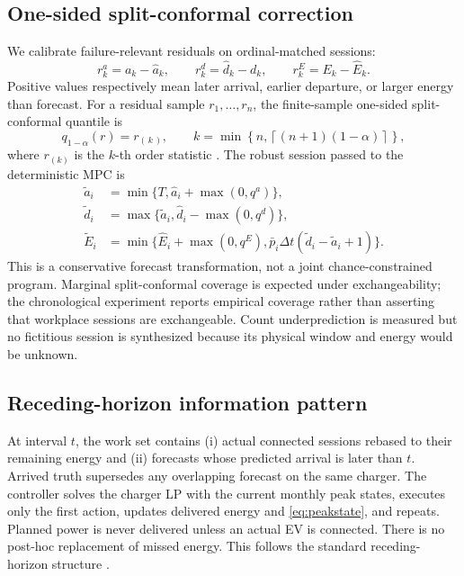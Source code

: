 \documentclass[11pt]{article}
\begin{document}
\subsection{One-sided split-conformal correction}

We calibrate failure-relevant residuals on ordinal-matched sessions:
\begin{equation}
 r^a_k=a_k-\widehat a_k,\qquad
 r^d_k=\widehat d_k-d_k,\qquad
 r^E_k=E_k-\widehat E_k .                            \label{eq:residuals}
\end{equation}
Positive values respectively mean later arrival, earlier departure, or larger
energy than forecast.  For a residual sample \(r_1,\ldots,r_n\), the
finite-sample one-sided split-conformal quantile is
\begin{equation}
 q_{1-\alpha}(r)=r_{(\,k\,)},\qquad
 k=\min\!\left\{n,\left\lceil(n+1)(1-\alpha)\right\rceil\right\},
                                                           \label{eq:quantile}
\end{equation}
where \(r_{(k)}\) is the \(k\)-th order statistic
\citep{shafer2008tutorial,romano2019conformalized}.  The robust session passed
to the deterministic MPC is
\begin{subequations}\label{eq:robust}
\begin{align}
 \widetilde a_i&=\min\{T,\widehat a_i+\max(0,q^a)\},\\
 \widetilde d_i&=\max\{\widetilde a_i,
                       \widehat d_i-\max(0,q^d)\},\\
 \widetilde E_i&=\min\{\widehat E_i+\max(0,q^E),
 \bar p_i\Delta t(\widetilde d_i-\widetilde a_i+1)\}.
\end{align}
\end{subequations}
This is a conservative forecast transformation, not a joint chance-constrained
program.  Marginal split-conformal coverage is expected under exchangeability;
the chronological experiment reports empirical coverage rather than asserting
that workplace sessions are exchangeable.  Count underprediction is measured
but no fictitious session is synthesized because its physical window and
energy would be unknown.

\subsection{Receding-horizon information pattern}
\label{sec:rolling}

At interval \(t\), the work set contains (i) actual connected sessions rebased
to their remaining energy and (ii) forecasts whose predicted arrival is later
than \(t\).  Arrived truth supersedes any overlapping forecast on the same
charger.  The controller solves the charger LP with the current monthly peak
states, executes only the first action, updates delivered energy and
\eqref{eq:peakstate}, and repeats.  Planned power is never delivered unless an
actual EV is connected.  There is no post-hoc replacement of missed energy.
This follows the standard receding-horizon structure \citep{rawlings2017mpc}.
\end{document}

